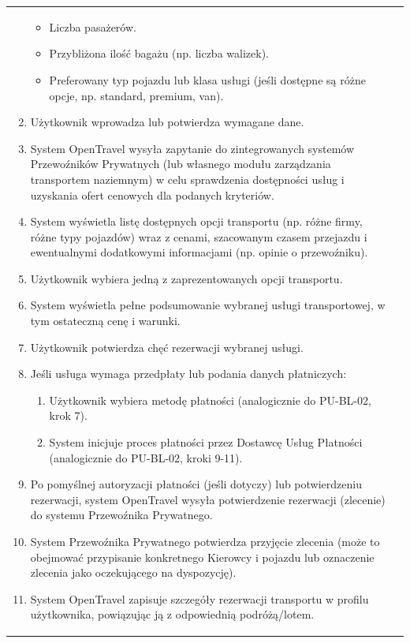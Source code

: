 \documentclass[a4paper,12pt]{article}
\begin{document}
\begin{longtable}{|p{\pierwszakolumnaszerokoscPUBLRezTransLot}|p{\drugakolumnaszerokoscPUBLRezTransLot}|}
\begin{enumerate}
\begin{itemize}
                    \item Liczba pasażerów.
                    \item Przybliżona ilość bagażu (np. liczba walizek).
                    \item Preferowany typ pojazdu lub klasa usługi (jeśli dostępne są różne opcje, np. standard, premium, van).
                \end{itemize}
            \item Użytkownik wprowadza lub potwierdza wymagane dane.
            \item System OpenTravel wysyła zapytanie do zintegrowanych systemów Przewoźników Prywatnych (lub własnego modułu zarządzania transportem naziemnym) w celu sprawdzenia dostępności usług i uzyskania ofert cenowych dla podanych kryteriów.
            \item System wyświetla listę dostępnych opcji transportu (np. różne firmy, różne typy pojazdów) wraz z cenami, szacowanym czasem przejazdu i ewentualnymi dodatkowymi informacjami (np. opinie o przewoźniku).
            \item Użytkownik wybiera jedną z zaprezentowanych opcji transportu.
            \item System wyświetla pełne podsumowanie wybranej usługi transportowej, w tym ostateczną cenę i warunki.
            \item Użytkownik potwierdza chęć rezerwacji wybranej usługi.
            \item Jeśli usługa wymaga przedpłaty lub podania danych płatniczych:
                \begin{enumerate} \itemsep0pt \parskip0pt \parsep0pt
                    \item Użytkownik wybiera metodę płatności (analogicznie do PU-BL-02, krok 7).
                    \item System inicjuje proces płatności przez Dostawcę Usług Płatności (analogicznie do PU-BL-02, kroki 9-11).
                \end{enumerate}
            \item Po pomyślnej autoryzacji płatności (jeśli dotyczy) lub potwierdzeniu rezerwacji, system OpenTravel wysyła potwierdzenie rezerwacji (zlecenie) do systemu Przewoźnika Prywatnego.
            \item System Przewoźnika Prywatnego potwierdza przyjęcie zlecenia (może to obejmować przypisanie konkretnego Kierowcy i pojazdu lub oznaczenie zlecenia jako oczekującego na dyspozycję).
            \item System OpenTravel zapisuje szczegóły rezerwacji transportu w profilu użytkownika, powiązując ją z odpowiednią podróżą/lotem.

\end{enumerate}
\end{longtable}
\end{document}
